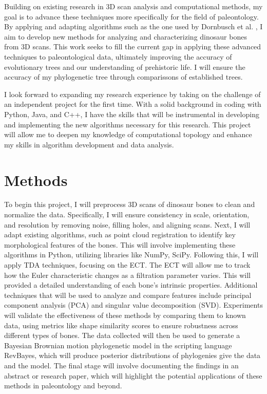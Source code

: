 \documentclass[12pt]{article}
\begin{document}
Building on existing research in 3D scan analysis and computational methods, my
goal is to advance these techniques more specifically for the field of
paleontology. By applying and adapting algorithms such as the one used by
Dornbusch et al. \citep{dornbusch2007}, I aim to develop new methods for analyzing 
and characterizing dinosaur bones from 3D scans. This work seeks to fill the 
current gap in applying these advanced techniques to paleontological data, 
ultimately improving the accuracy of evolutionary trees and our understanding of 
prehistoric life. I will ensure the accuracy of my phylogenetic tree through
comparissons of established trees.

I look forward to expanding my research experience by taking on the challenge of
an independent project for the first time. With a solid background in
coding with Python, Java, and C++, I have the skills that will be instrumental 
in developing and implementing the new algorithms necessary for this research. 
This project will allow me to deepen my knowledge of computational topology and 
enhance my skills in algorithm development and data analysis. 

\section{Methods}
To begin this project, I will preprocess 3D scans of dinosaur bones to clean and
normalize the data. Specifically, I will ensure consistency in scale, orientation, 
and resolution by removing noise, filling holes, and aligning scans.  Next, I 
will adapt existing algorithms, such as point cloud registration to identify key 
morphological features of the bones. This will involve implementing these
algorithms in Python, utilizing libraries like NumPy, SciPy. Following this, 
I will apply TDA techniques, focusing on the ECT. The ECT will
allow me to track how the Euler characteristic changes as a filtration parameter
varies. This will provided a detailed understanding of each bone's intrinsic
properties. Additional techniques that will be used to analyze and compare
features include principal component analysis (PCA) and singular value 
decomposition (SVD). Experiments will validate the effectiveness of these methods 
by comparing them to known data, using metrics like shape similarity scores to 
ensure robustness across different types of bones.
The data collected will then be used to generate a Bayesian Brownian motion
phylogenetic model in the scripting language RevBayes, which will produce
posterior distributions of phylogenies give the data and the model. 
The final stage will involve documenting the findings in an abstract or research 
paper, which will highlight the potential applications of these methods in 
paleontology and beyond.
\end{document}
